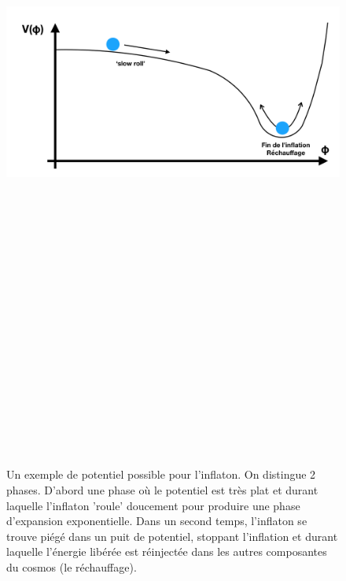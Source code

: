 \begin{figure}[htbp]
	\centering
		\includegraphics[height=25cm]{figs/slowroll.png}
	\caption[Un exemple de potentiel possible pour l'inflaton. ]{Un exemple de potentiel possible pour l'inflaton. On distingue 2 phases. D'abord une phase où le potentiel est très plat et durant laquelle l'inflaton 'roule' doucement pour produire une phase d'expansion exponentielle. Dans un second temps, l'inflaton se trouve piégé dans un puit de potentiel, stoppant l'inflation et durant laquelle l'énergie libérée est réinjectée dans les autres composantes du cosmos (le réchauffage).}
	\label{f:slowroll}
\end{figure}

